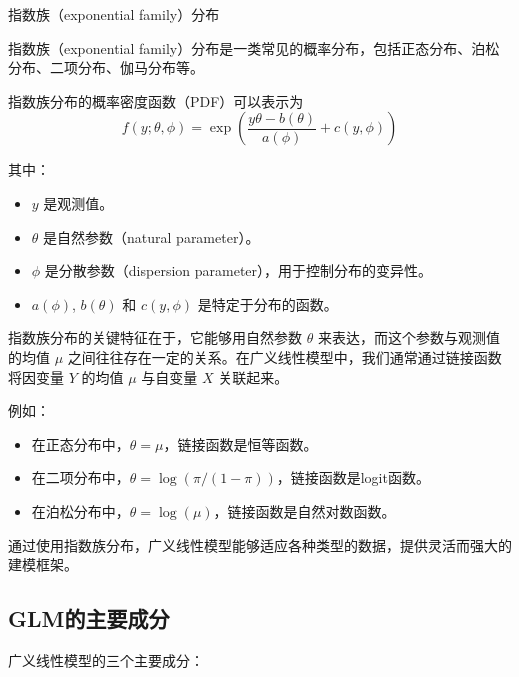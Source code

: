 \begin{note}
    指数族（exponential family）分布

    指数族（exponential family）分布是一类常见的概率分布，包括正态分布、泊松分布、二项分布、伽马分布等。

    指数族分布的概率密度函数（PDF）可以表示为
    \begin{equation}
        f(y;\theta,\phi) = \exp \left( \frac{y\theta - b(\theta)}{a(\phi)} + c(y,\phi) \right)
    \end{equation}

    其中：
    \begin{itemize}[itemsep=0pt,parsep=0pt]
        \item \( y \) 是观测值。
        \item \( \theta \) 是自然参数（natural parameter）。
        \item \( \phi \) 是分散参数（dispersion parameter），用于控制分布的变异性。
        \item \( a(\phi) \), \( b(\theta) \) 和 \( c(y,\phi) \) 是特定于分布的函数。
    \end{itemize}

    指数族分布的关键特征在于，它能够用自然参数 \( \theta \) 来表达，而这个参数与观测值的均值 \( \mu \) 之间往往存在一定的关系。在广义线性模型中，我们通常通过链接函数将因变量 \( Y \) 的均值 \( \mu \) 与自变量 \( X \) 关联起来。

    例如：

    \begin{itemize}[itemsep=0pt,parsep=0pt]
        \item 在正态分布中，\( \theta = \mu \)，链接函数是恒等函数。
        \item 在二项分布中，\( \theta = \log(\pi/(1-\pi)) \)，链接函数是logit函数。
        \item 在泊松分布中，\( \theta = \log(\mu) \)，链接函数是自然对数函数。
    \end{itemize}

    通过使用指数族分布，广义线性模型能够适应各种类型的数据，提供灵活而强大的建模框架。

\end{note}

\subsection{GLM的主要成分}

广义线性模型的三个主要成分：

